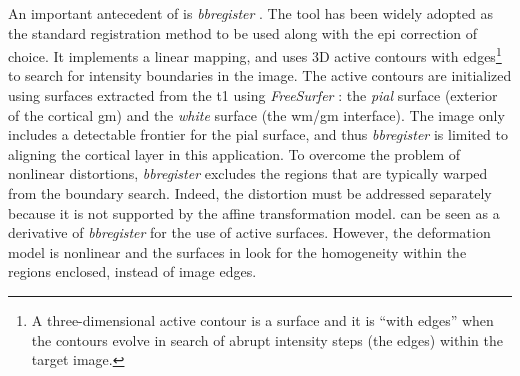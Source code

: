 {An important antecedent of \regseg{} is \emph{bbregister} \citep{greve_accurate_2009}.
The tool has been widely adopted as the standard registration method to be used along with the \gls*{epi}
  correction of choice.
It implements a linear mapping, and uses 3D active contours with edges\footnote{A three-dimensional active contour
  is a surface and it is ``with edges'' when the contours evolve in search of abrupt intensity steps
  (the edges) within the target image.} to search for intensity boundaries in the \lowb{} image.
The active contours are initialized using surfaces extracted from the \gls*{t1} using
  \emph{FreeSurfer} \citep{fischl_freesurfer_2012}: the \emph{pial} surface (exterior of the
  cortical \gls*{gm}) and the \emph{white} surface (the \gls*{wm}/\gls*{gm} interface).
The \lowb{} image only includes a detectable frontier for the pial surface, and thus
  \emph{bbregister} is limited to aligning the cortical layer in this
  application.
To overcome the problem of nonlinear distortions, \emph{bbregister} excludes the
  regions that are typically warped from the boundary search.
Indeed, the distortion must be addressed separately because it is not supported by
  the affine transformation model.
\Regseg{} can be seen as a derivative of \emph{bbregister} for the use of active surfaces.
However, the deformation model is nonlinear and the surfaces in \regseg{} look for the
  homogeneity within the regions enclosed, instead of image edges.}


